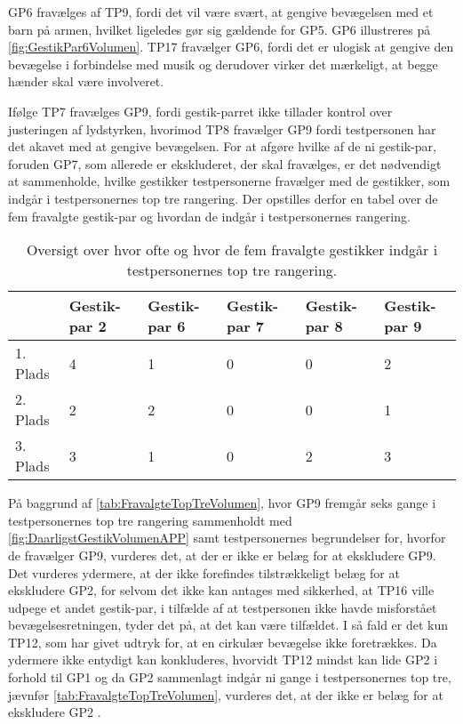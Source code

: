 GP6 fravælges af TP9, fordi det vil være svært, at gengive bevægelsen med et barn på armen, hvilket ligeledes gør sig gældende for GP5. GP6 illustreres på \autoref{fig:GestikPar6Volumen}. TP17 fravælger GP6, fordi det er ulogisk at gengive den bevægelse i forbindelse med musik og derudover virker det mærkeligt, at begge hænder skal være involveret. 

Ifølge TP7 fravælges GP9, fordi gestik-parret ikke tillader kontrol over justeringen af lydstyrken, hvorimod TP8 fravælger GP9 fordi testpersonen har det akavet med at gengive bevægelsen.\blankline
%
For at afgøre hvilke af de ni gestik-par, foruden GP7, som allerede er ekskluderet, der skal fravælges, er det nødvendigt at sammenholde, hvilke gestikker testpersonerne fravælger med de gestikker, som indgår i testpersonernes top tre rangering. Der opstilles derfor en tabel over de fem fravalgte gestik-par og hvordan de indgår i testpersonernes rangering.    
%
\begin{table}[H]
	\centering
	\begin{tabular}{ | p{1.5cm} | p{2.1cm} | p{2.1cm} | p{2.1cm} | p{2.1cm} | p{2.1cm} |}
	\hline
		 & Gestik-par 2 & Gestik-par 6 & Gestik-par 7 & Gestik-par 8 & Gestik-par 9 \\ \hline
		1. Plads & 4 & 1 & 0 & 0 & 2\\ \hline
		2. Plads & 2 & 2 & 0 & 0 & 1\\ \hline
		3. Plads & 3 & 1 & 0 & 2 & 3\\ \hline
	\end{tabular}
	\caption{Oversigt over hvor ofte og hvor de fem fravalgte gestikker indgår i testpersonernes top tre rangering.}
	\label{tab:FravalgteTopTreVolumen}
\end{table}
\noindent
%
På baggrund af \autoref{tab:FravalgteTopTreVolumen}, hvor GP9 fremgår seks gange i testpersonernes top tre rangering sammenholdt med \autoref{fig:DaarligstGestikVolumenAPP} samt testpersonernes begrundelser for, hvorfor de fravælger GP9, vurderes det, at der er ikke er belæg for at ekskludere GP9. Det vurderes ydermere, at der ikke forefindes tilstrækkeligt belæg for at ekskludere GP2, for selvom det ikke kan antages med sikkerhed, at TP16 ville udpege et andet gestik-par, i tilfælde af at testpersonen ikke havde misforstået bevægelsesretningen, tyder det på, at det kan være tilfældet. I så fald er det kun TP12, som har givet udtryk for, at en cirkulær bevægelse ikke foretrækkes. Da ydermere ikke entydigt kan konkluderes, hvorvidt TP12 mindst kan lide GP2 i forhold til GP1 og da GP2 sammenlagt indgår ni gange i testpersonernes top tre, jævnfør \autoref{tab:FravalgteTopTreVolumen}, vurderes det, at der ikke er belæg for at ekskludere GP2 .
